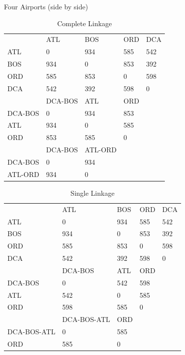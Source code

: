 \documentclass[xcolor=x11names,compress]{beamer}\usepackage[]{graphicx}\usepackage[]{color}
\begin{document}
\begin{frame}{Four Airports (side by side)}
  \begin{table}[!htb]
    \tiny
      \centering
          \begin{tabular}{lllll}
   & ATL&BOS&ORD& DCA\\
ATL&  0 &934&585&542\\
BOS& 934&  0&853& 392\\
ORD& 585&853&  0& 598\\
DCA& 542&392& 598&   0
\\ \hline
       &DCA-BOS&ATL&ORD\\
DCA-BOS&0      &934&853   \\
ATL    &934    &0  &585\\
ORD    &853       &585&0
\\ \hline
          &DCA-BOS&ATL-ORD\\
DCA-BOS&0          &934   \\
ATL-ORD&934       &0
\end{tabular}
\caption{Complete Linkage}
\end{table}
\begin{table}[!htb]
    \tiny
      \centering
        \begin{tabular}{lllll}
   & ATL&BOS&ORD& DCA\\
ATL&  0 &934&585&542\\
BOS& 934&  0&853& 392\\
ORD& 585&853&  0& 598\\
DCA& 542&392& 598&   0
\\ \hline
       &DCA-BOS&ATL&ORD\\
DCA-BOS&0      &542&598   \\
ATL    &542    &0  &585\\
ORD    &598       &585&0
\\ \hline
           &DCA-BOS-ATL&ORD\\
DCA-BOS-ATL&0          &585   \\
ORD        &585        &0
\end{tabular}
\caption{Single Linkage}    
\end{table}
\end{frame}
\end{document}
